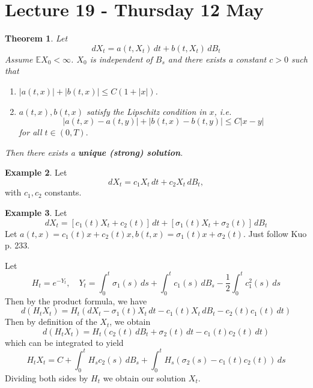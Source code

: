 \documentclass[10pt, oneside, reqno]{amsart}
\theoremstyle{plain}%
\newtheorem{thm}{Theorem}[section]
\theoremstyle{definition}
\newtheorem{exmp}[thm]{Example}
\theoremstyle{remark}
\newcommand{\E}{\mathbb{E}}
\begin{document}


\section{Lecture 19 - Thursday 12 May} %
\label{sec:lecture_19_thursday_12_may}

\begin{thm}
    Let \[
        dX_t = a(t, X_t) \, dt + b(t, X_t) \, dB_t
    \]
    Assume $\E X_0 < \infty$.  $X_0$ is independent of $B_s$ and there exists a constant $c > 0$ such that \begin{enumerate}
        \item $|a(t, x)| + |b(t, x)| \leq C(1 + |x|)$.  
        \item $a(t, x), b(t, x)$ satisfy the Lipschitz condition in $x$, i.e.\[
            |a(t,x)- a(t, y)| + |b(t, x) - b(t, y)| \leq C|x - y|
        \] for all $t \in (0, T).  $
    \end{enumerate}  Then there exists a \textbf{unique (strong) solution}. 
\end{thm}

\begin{exmp}
    Let \[
        dX_t = c_1 X_t \, dt + c_2 X_t \, dB_t,
    \] with $c_1, c_2$ constants.  
\end{exmp}

\begin{exmp}
    Let \[
        dX_t = [ c_1(t) X_t + c_2(t)] \, dt + [ \sigma_1(t) X_t + \sigma_2(t)] \, dB_t
    \]  Let $a(t,x) = c_1(t)x  + c_2(t)x, b(t,x) = \sigma_1(t) x + \sigma_2(t)$.  
        Just follow Kuo p. 233.
        
        Let \[
            H_t = e^{-Y_t}, \quad Y_t = \int_0^t \sigma_1(s) \, ds + \int_0^t c_1(s) \, dB_s - \frac{1}{2} \int_0^t c^2_1(s) \, ds
        \]   Then by the \ito product formula, we have \[
            d(H_t X_t) = H_t \left( dX_t - \sigma_1(t) X_t \, dt - c_1(t) X_t \, dB_t - c_2(t) c_1(t) \, dt \right)
        \] Then by definition of the $X_t$, we obtain \[
            d(H_t X_t) = H_t \left( c_2(t) \, dB_t + \sigma_2(t) \, dt - c_1(t) c_2(t) \, dt \right)
        \] which can be integrated to yield \[
            H_t X_t = C + \int_0^t H_s c_2(s) \, dB_s + \int_0^t H_s(\sigma_2(s) - c_1(t) c_2(t)) \, ds
        \] Dividing both sides by $H_t$ we obtain our solution $X_t$.  
\end{exmp}
\end{document}
